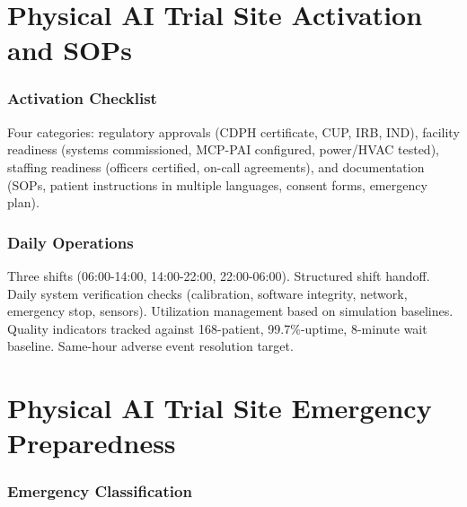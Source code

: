 \documentclass[11pt,letterpaper]{article}
\begin{document}
\newpage


\part{Physical AI Trial Site Activation and SOPs}

\section{Activation Checklist}

Four categories: regulatory approvals (CDPH certificate, CUP, IRB, IND),
facility readiness (systems commissioned, MCP-PAI configured, power/HVAC
tested), staffing readiness (officers certified, on-call agreements), and
documentation (SOPs, patient instructions in multiple languages, consent
forms, emergency plan).

\section{Daily Operations}

Three shifts (06:00-14:00, 14:00-22:00, 22:00-06:00). Structured shift
handoff. Daily system verification checks (calibration, software integrity,
network, emergency stop, sensors). Utilization management based on simulation
baselines. Quality indicators tracked against 168-patient, 99.7\%-uptime,
8-minute wait baseline. Same-hour adverse event resolution target.

\newpage


\part{Physical AI Trial Site Emergency Preparedness}

\section{Emergency Classification}
\end{document}
